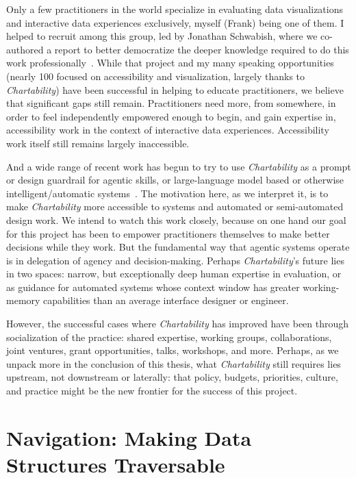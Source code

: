 \documentclass[12pt]{cmuthesis}
\begin{document}
Only a few practitioners in the world specialize in evaluating data visualizations and interactive data experiences exclusively, myself (Frank) being one of them. I helped to recruit among this group, led by Jonathan Schwabish, where we co-authored a report to better democratize the deeper knowledge required to do this work professionally~\cite{Schwabish2022}. While that project and my many speaking opportunities (nearly 100 focused on accessibility and visualization, largely thanks to \textit{Chartability}) have been successful in helping to educate practitioners, we believe that significant gaps still remain. Practitioners need more, from somewhere, in order to feel independently empowered enough to begin, and gain expertise in, accessibility work in the context of interactive data experiences. Accessibility work itself still remains largely inaccessible.

And a wide range of recent work has begun to try to use \textit{Chartability} as a prompt or design guardrail for agentic skills, or large-language model based or otherwise intelligent/automatic systems~\cite{Swaroop2026,Mauri2026,Madan2026,Chundury2025,Gyarmati2025,Selvam2025}. The motivation here, as we interpret it, is to make \textit{Chartability} more accessible to systems and automated or semi-automated design work. We intend to watch this work closely, because on one hand our goal for this project has been to empower practitioners themselves to make better decisions while they work. But the fundamental way that agentic systems operate is in delegation of agency and decision-making. Perhaps \textit{Chartability}'s future lies in two spaces: narrow, but exceptionally deep human expertise in evaluation, or as guidance for automated systems whose context window has greater working-memory capabilities than an average interface designer or engineer.

However, the successful cases where \textit{Chartability} has improved have been through socialization of the practice: shared expertise, working groups, collaborations, joint ventures, grant opportunities, talks, workshops, and more. Perhaps, as we unpack more in the conclusion of this thesis, what \textit{Chartability} still requires lies upstream, not downstream or laterally: that policy, budgets, priorities, culture, and practice might be the new frontier for the success of this project.

\part{Navigation: Making Data Structures Traversable}
\end{document}
